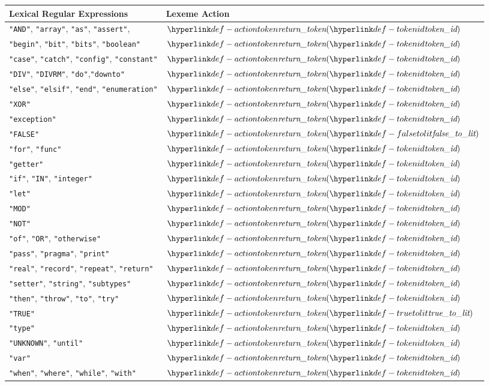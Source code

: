\begin{center}
\begin{tabular}{ll}
\textbf{Lexical Regular Expressions} & \textbf{Lexeme Action}\\
\hline
\texttt{"AND"}, \texttt{"array"}, \texttt{"as"}, \texttt{"assert"},      & $\actiontoken(\tokenid)$ \\
\texttt{"begin"}, \texttt{"bit"}, \texttt{"bits"}, \texttt{"boolean"}       & $\actiontoken(\tokenid)$ \\
\texttt{"case"}, \texttt{"catch"}, \texttt{"config"}, \texttt{"constant"}      & $\actiontoken(\tokenid)$ \\
\texttt{"DIV"}, \texttt{"DIVRM"}, \texttt{"do"},\texttt{"downto"}        & $\actiontoken(\tokenid)$ \\
\texttt{"else"}, \texttt{"elsif"}, \texttt{"end"}, \texttt{"enumeration"}   & $\actiontoken(\tokenid)$ \\
\texttt{"XOR"}           & $\actiontoken(\tokenid)$ \\
\texttt{"exception"}     & $\actiontoken(\tokenid)$ \\
\texttt{"FALSE"} & $\actiontoken(\falsetolit)$  \\
\texttt{"for"}, \texttt{"func"}          & $\actiontoken(\tokenid)$ \\
\texttt{"getter"}        & $\actiontoken(\tokenid)$ \\
\texttt{"if"}, \texttt{"IN"}, \texttt{"integer"}       & $\actiontoken(\tokenid)$ \\
\texttt{"let"}           & $\actiontoken(\tokenid)$ \\
\texttt{"MOD"}           & $\actiontoken(\tokenid)$ \\
\texttt{"NOT"}           & $\actiontoken(\tokenid)$ \\
\texttt{"of"},      \texttt{"OR"},      \texttt{"otherwise"}                  & $\actiontoken(\tokenid)$ \\
\texttt{"pass"},    \texttt{"pragma"},  \texttt{"print"}                      & $\actiontoken(\tokenid)$ \\
\texttt{"real"},    \texttt{"record"},  \texttt{"repeat"}, \texttt{"return"}  & $\actiontoken(\tokenid)$ \\
\texttt{"setter"},  \texttt{"string"},  \texttt{"subtypes"}                   & $\actiontoken(\tokenid)$ \\
\texttt{"then"},    \texttt{"throw"},   \texttt{"to"}, \texttt{"try"}         & $\actiontoken(\tokenid)$ \\
\texttt{"TRUE"}          & $\actiontoken(\truetolit)$ \\
\texttt{"type"}          & $\actiontoken(\tokenid)$ \\
\texttt{"UNKNOWN"}, \texttt{"until"}         & $\actiontoken(\tokenid)$ \\
\texttt{"var"}           & $\actiontoken(\tokenid)$ \\
\texttt{"when"}, \texttt{"where"}, \texttt{"while"}, \texttt{"with"}          & $\actiontoken(\tokenid)$ \\
\hline
\end{tabular}
\end{center}

